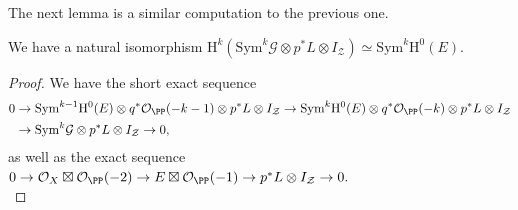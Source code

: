 The next lemma is a similar computation to the previous one.
\begin{lem}
\notready \label{first-twist-lem}
We have a natural isomorphism
$\mathrm{H}^k(\mathrm{Sym}^{k} \mathcal{G} \otimes p^*L \otimes I_{\mathcal{Z}}) \simeq \mathrm{Sym}^k \mathrm{H}^0(E).$

\end{lem}
\begin{proof}
We have the short exact sequence
\begin{align*}
0 &\to \mathrm{Sym}^{k-1} \mathrm{H}^0(E) \otimes q^*\mathcal{O}_{\PP}(-k-1) \otimes p^*L \otimes I_{\mathcal{Z}} \to \mathrm{Sym}^{k}\mathrm{H}^0(E) \otimes q^*\mathcal{O}_{\PP}(-k) \otimes p^*L \otimes I_{\mathcal{Z}} \\
&\to \mathrm{Sym}^{k}\mathcal{G} \otimes p^*L \otimes I_{\mathcal{Z}}\to 0,
\end{align*}
as well as the exact sequence
$0 \to \mathcal{O}_X \boxtimes \mathcal{O}_{\PP}(-2) \to E \boxtimes \mathcal{O}_{\PP}(-1) \to p^*L \otimes I_{\mathcal{Z}} \to 0.$\\



\end{proof}
